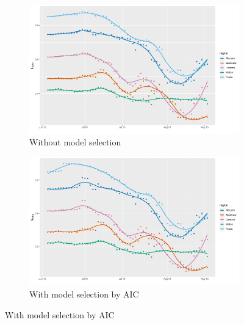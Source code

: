 \documentclass[12pt]{article}
\begin{document}
\begin{appendices}
		\begin{figure}[H]
    	    \centering
    	    \begin{subfigure}{\textwidth}
    	      \centering
    	      \includegraphics[width=0.95\linewidth]{output/model_within_lag14_betawithin_Sud_rolling.pdf}
    	      \caption{Without model selection}
    	      \label{fig:beta_within_over_time_sud_regular}
    	    \end{subfigure}\newline
    	    \begin{subfigure}{\textwidth}
    	      \centering
    	      \includegraphics[width=0.95\linewidth]{output/model_within_lag14_betawithin_Sud_aic_rolling.pdf}
    	      \caption{With model selection by AIC}
    	      \label{fig:beta_within_over_time_sud_aic}
    	    \end{subfigure}
    	\end{figure}
        \begin{figure}[H]\ContinuedFloat
    	    \begin{subfigure}{\textwidth}
    	      \centering

\end{subfigure}
\end{figure}
\end{appendices}
\end{document}
